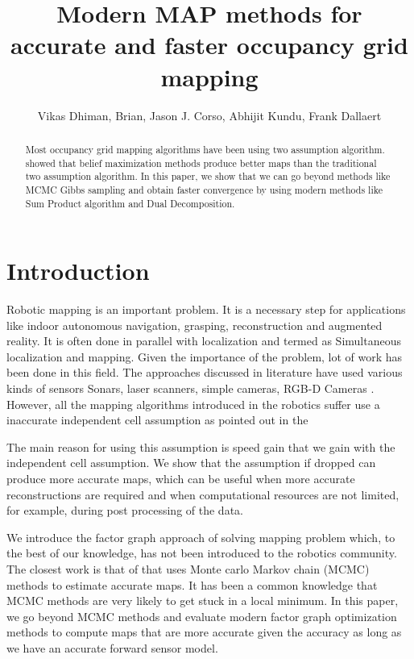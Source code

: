 \documentclass[letterpaper, 10 pt, conference]{ieeeconf} %
\title{Modern MAP methods for accurate and faster occupancy grid mapping}
\author{Vikas Dhiman, Brian, Jason J. Corso, Abhijit Kundu, Frank Dallaert}
\begin{document}
\maketitle
\begin{abstract}
  Most occupancy grid mapping algorithms have been using two assumption
  algorithm.  \cite{merali2013icra} showed that belief maximization methods
  produce better maps than the traditional two assumption algorithm.  In this
  paper, we show that we can go beyond methods like MCMC Gibbs sampling and
  obtain faster convergence by using modern methods like Sum Product algorithm
  and Dual Decomposition.
\end{abstract}
\section{Introduction}
Robotic mapping is an important problem. It is a necessary step for applications like indoor autonomous navigation, grasping, reconstruction and augmented reality. It is often done in parallel with localization and termed as Simultaneous localization and mapping. Given the importance of the problem, lot of work has been done in this field. The approaches discussed in literature have used various kinds of sensors 
Sonars,%
laser scanners, %
simple cameras, %
RGB-D Cameras \cite{newcombe2011kinectfusion, whelan2013robust, whelan2012kintinuous}. 
However, all the mapping algorithms introduced in the robotics suffer use a inaccurate independent cell assumption as pointed out in the %

The main reason for using this assumption is speed gain that we gain with the independent cell assumption. We show that the assumption if dropped can produce more accurate maps, which can be useful when more accurate reconstructions are required and when computational resources are not limited, for example, during post processing of the data.

We introduce the factor graph approach of solving mapping problem which, to the best of our knowledge, has not been introduced to the robotics community. The closest work is that of \cite{merali2013icra} that uses Monte carlo Markov chain (MCMC) methods to estimate accurate maps. It has been a common knowledge that MCMC methods are very likely to get stuck in a local minimum. In this paper, we go beyond MCMC methods and evaluate modern factor graph optimization methods to compute maps that are more accurate given the accuracy as long as we have an accurate forward sensor model.
\end{document}
